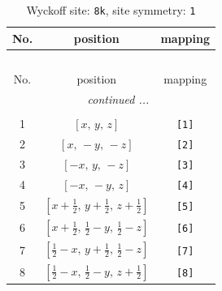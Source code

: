 \documentclass[fleqn,8pt]{jsarticle}
\begin{document}
\renewcommand{\arraystretch}{1.2}
\begin{longtable}{ccc}
\caption{Wyckoff site: {\tt 8k}, site symmetry: {\tt 1}}
 \\
 \hline \hline
No. & position & mapping \\ \hline \endfirsthead

\multicolumn{2}{l}{\tablename\ \thetable{}} \\
 \hline \hline
No. & position & mapping \\ \hline \endhead

 \hline \hline
\multicolumn{2}{r}{\footnotesize\it continued ...} \\ \endfoot

 \hline \hline
\multicolumn{2}{r}{} \\ \endlastfoot

1 & $\left[ x,\, y,\, z \right]$ & {\tt [1]} \\ \hline
2 & $\left[ x,\, - y,\, - z \right]$ & {\tt [2]} \\ \hline
3 & $\left[ - x,\, y,\, - z \right]$ & {\tt [3]} \\ \hline
4 & $\left[ - x,\, - y,\, z \right]$ & {\tt [4]} \\ \hline
5 & $\left[ x + \frac{1}{2},\, y + \frac{1}{2},\, z + \frac{1}{2} \right]$ & {\tt [5]} \\ \hline
6 & $\left[ x + \frac{1}{2},\, \frac{1}{2} - y,\, \frac{1}{2} - z \right]$ & {\tt [6]} \\ \hline
7 & $\left[ \frac{1}{2} - x,\, y + \frac{1}{2},\, \frac{1}{2} - z \right]$ & {\tt [7]} \\ \hline
8 & $\left[ \frac{1}{2} - x,\, \frac{1}{2} - y,\, z + \frac{1}{2} \right]$ & {\tt [8]} \\
\end{longtable}
\end{document}
